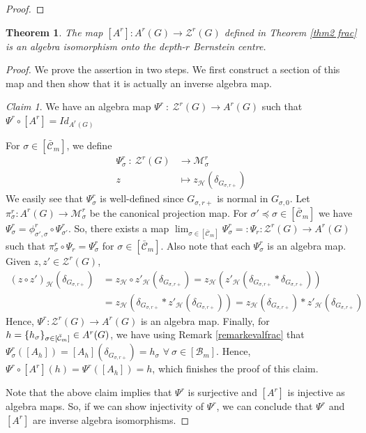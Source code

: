 \documentclass[11 pt]{article}
\numberwithin{equation}{subsection}
\newtheorem{theorem}{Theorem}[section]
\theoremstyle{definition}
\theoremstyle{remark}
\newtheorem{claim}{Claim}[theorem]
\theoremstyle{conjecture}
\newcommand{\HH}{\mathcal H}
\newcommand{\M}{\mathcal{M}}
\newcommand{\B}{\mathcal{B}}
\newcommand{\ZZ}{\mathcal{Z}}
\newcommand{\mc}{\mathcal}
\newcommand{\mcC}{\mathcal C}
\begin{document}
\begin{proof}
\end{proof}
\begin{theorem}\label{thm: isominverselimit}
    The map $[A^r]: A^r(G) \rightarrow \ZZ^r(G) $ defined in Theorem \ref{thm2 frac} is an algebra isomorphism onto the depth-$r$ Bernstein centre.
\end{theorem}
\begin{proof}
    We prove the assertion in two steps. We first construct a section of this map and then show that it is actually an inverse algebra map. 
    \begin{claim}
         We have an algebra map $\Psi^r \::\: \mc Z^r(G) \longrightarrow A^r(G)$ such that $\Psi^r \circ [A^r] = Id_{A^r(G)}$
    \end{claim}
    For $\sigma \in [\bar{\mcC}_m]$, we define 
    \begin{align*}
        \Psi^r_\sigma \::\: \mc Z^r(G) &\longrightarrow \M^r_\sigma\\
        z &\longmapsto z_\HH(\delta_{G_{\sigma, r+}})
    \end{align*}
    We easily see that $\Psi^r_\sigma$ is well-defined since $G_{\sigma, r+}$ is normal in $G_{\sigma,0}$. Let $\pi^r_\sigma:A^r(G) \rightarrow \M^r_\sigma $ be the canonical projection map. For $\sigma' \preceq \sigma \in [\bar{\mcC}_m]$ we have $\Psi^r_\sigma=  \phi^r_{\sigma',\sigma}\circ\Psi^r_{\sigma'}$. So, there exists a map $\lim_{\sigma \in [\bar{\mcC}_m]}\Psi^r_\sigma =:\Psi_r : \mc Z^r(G) \longrightarrow A^r(G)$ such that $\pi^r_\sigma \circ \Psi_r=\Psi^r_\sigma$ for $\sigma \in [\bar{\mcC}_m]$. Also note that each $\Psi^r_\sigma$ is an algebra map. Given $z,z' \in \ZZ^r(G)$,
    \begin{align*}
        (z\circ z')_\HH(\delta_{G_{\sigma, r+}}) &= z_\HH \circ {z'}_\HH(\delta_{G_{\sigma, r+}})=z_\HH({z'}_\HH(\delta_{G_{\sigma, r+}}*\delta_{G_{\sigma, r+}}))\\
        &= z_\HH(\delta_{G_{\sigma, r+}}*{z'}_\HH(\delta_{G_{\sigma, r+}})) =z_\HH(\delta_{G_{\sigma, r+}})*{z'}_\HH(\delta_{G_{\sigma, r+}})
    \end{align*}
    Hence, $\Psi^r : \ZZ^r(G) \rightarrow A^r(G)$ is an algebra map.  Finally, for $h=\{ h_\sigma\}_{\sigma\in [\Bar{\mcC}_m]}\in A^r(G)$, we have using Remark \ref{remarkevalfrac} that $\Psi^r_\sigma([A_h])= [A_h](\delta_{G_{\sigma,r+}})= h_\sigma$ $\forall \: \sigma \in [\B_m]$. Hence, $\Psi^r \circ [A^r] (h) = \Psi^r([A_h])=h$, which finishes the proof of this claim. \par
    Note that the above claim implies that $\Psi^r$ is surjective and $[A^r]$ is injective as algebra maps. So, if we can show injectivity of $\Psi^r$, we can conclude that $\Psi^r$ and $[A^r]$ are inverse algebra isomorphisms.

\end{proof}
\end{document}
